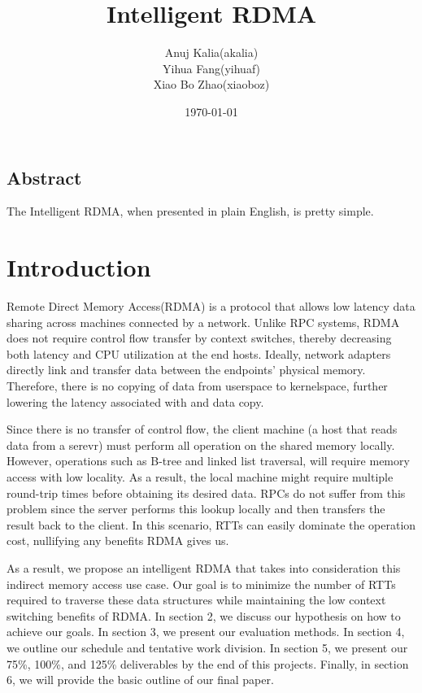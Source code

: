 \documentclass[a4paper, oneside, 10pt]{article}
\title{Intelligent RDMA} %
\author{Anuj Kalia(akalia)\\
		Yihua Fang(yihuaf)\\
		Xiao Bo Zhao(xiaoboz)}
\date{\today} %
\begin{document}
\maketitle
\thispagestyle{empty}
\newpage
\begin{center}
\vspace*{\fill}
\section*{Abstract}
The Intelligent RDMA, when presented in plain English, is pretty simple.\\
\vspace*{\fill}
\newpage
\end{center}


\section{Introduction}
Remote Direct Memory Access(RDMA) is a protocol that allows low latency data
sharing across machines connected by a network. Unlike RPC systems, RDMA does
not require control flow transfer by context switches, thereby decreasing both
latency and CPU utilization at the end hosts. Ideally, network adapters
directly link and transfer data between the endpoints' physical memory.
Therefore, there is no copying of data from userspace to kernelspace, further
lowering the latency associated with and data copy.

Since there is no transfer of control flow, the client machine (a host that
reads data from a serevr) must perform all operation on the shared memory
locally. However, operations such as B-tree and linked list traversal, will
require memory access with low locality. As a result, the local machine might
require multiple round-trip times before obtaining its desired data. RPCs do
not suffer from this problem since the server performs this lookup locally and
then transfers the result back to the client. In this scenario, RTTs can easily
dominate the operation cost, nullifying any benefits RDMA gives us.

As a result, we propose an intelligent RDMA that takes into consideration this
indirect memory access use case. Our goal is to minimize the number of RTTs
required to traverse these data structures while maintaining the low context
switching benefits of RDMA. In section 2, we discuss our hypothesis on how to
achieve our goals. In section 3, we present our evaluation methods. In section
4, we outline our schedule and tentative work division. In section 5, we
present our 75\%, 100\%, and 125\% deliverables by the end of this projects.
Finally, in section 6, we will provide the basic outline of our final paper.
\end{document}
